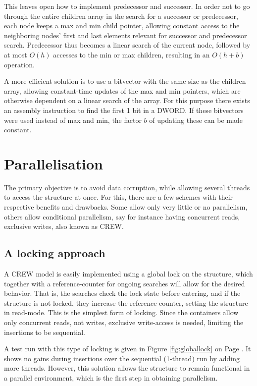 This leaves open how to implement {\keyword predecessor} and {\keyword
successor}. In order not to go through the entire children array in the search
for a {\keyword successor} or {\keyword predecessor}, each node keeps a
{\keyword max} and {\keyword min} child pointer, allowing constant access to
the neighboring nodes' first and last elements relevant for successor and
predecessor search. Predecessor thus becomes a linear search of the current
node, followed by at most $O(h)$ accesses to the {\keyword min} or {\keyword
max} children, resulting in an $O(h+b)$ operation.

A more efficient solution is to use a bitvector with the same size as the
children array, allowing constant-time updates of the {\keyword max} and
{\keyword min} pointers, which are otherwise dependent on a linear search of
the array. For this purpose there exists an assembly instruction to find the
first 1 bit in a DWORD. If these bitvectors were used instead of {\keyword max}
and {\keyword min}, the factor $b$ of updating these can be made constant.


\section{Parallelisation}
The primary objective is to avoid data corruption, while allowing several
threads to access the structure at once. For this, there are a few schemes with
their respective benefits and drawbacks. Some allow only very little or no
parallelism, others allow conditional parallelism, say for instance having
concurrent reads, exclusive writes, also known as CREW.

\subsection{A locking approach}
A CREW model is easily implemented using a global lock on the structure, which
together with a reference-counter for ongoing searches will allow for the
desired behavior. That is, the searches check the lock state before entering,
and if the structure is not locked, they increase the reference counter,
setting the structure in read-mode. This is the simplest form of locking.
Since the \STL containers allow only concurrent reads, not writes, exclusive
write-access is needed, limiting the insertions to be sequential.

A test run with this type of locking is given in Figure \ref{fig:globallock}
on Page \pageref{fig:globallock}.
It shows no gains during insertions over the sequential (1-thread) run by
adding more threads. However, this solution allows the structure to remain
functional in a parallel environment, which is the first step in obtaining
parallelism.


